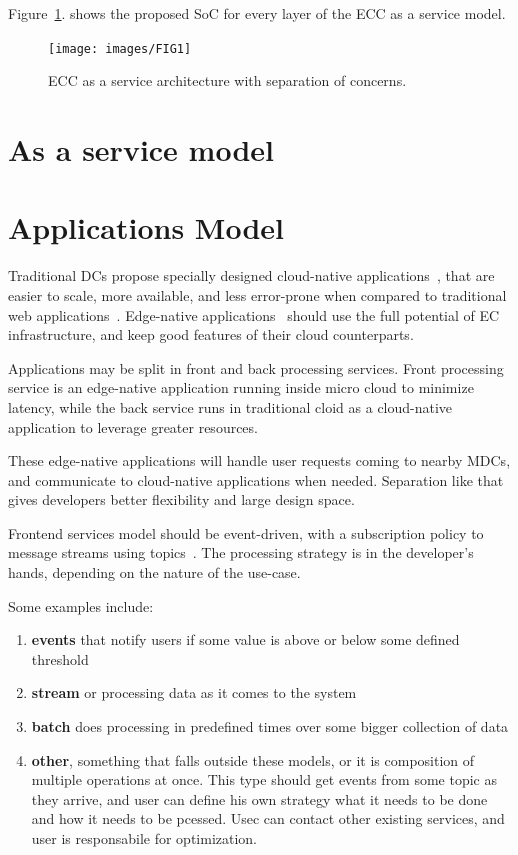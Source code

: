 Figure~\ref{fig:fig10}. shows the proposed SoC for every layer of the ECC as a service model.

\begin{figure}[H]
	\texttt{[image: images/FIG1]}
	\vspace{-0.7cm}
	\caption{ECC as a service architecture with separation of concerns.}
	\label{fig:fig10}
\end{figure}
%
%
\section{As a service model}\label{sec:as_a_service_model}
%
%
\section{Applications Model}\label{sec:application_model}
%
Traditional DCs propose specially designed cloud-native applications~\cite{GannonBS17}, that are easier to scale, more available, and less error-prone when compared to traditional web applications~\cite{GannonBS17}. Edge-native applications~\cite{SatyanarayananK19} should use the full potential of EC infrastructure, and keep good features of their cloud counterparts. 

Applications may be split in front and back processing services. Front processing service is an edge-native application running inside micro cloud to minimize latency, while the back service runs in traditional cloid as a cloud-native application to leverage greater resources. 

These edge-native applications will handle user requests coming to nearby MDCs, and communicate to cloud-native applications when needed. Separation like that gives developers better flexibility and large design space. 

Frontend services model should be event-driven, with a subscription policy to message streams using topics~\cite{inproceedingsBeck}. The processing strategy is in the developer's hands, depending on the nature of the use-case. 

Some examples include:

\begin{enumerate}[start=1,label={(\bfseries \arabic*)}]
	\item \textbf{events} that notify users if some value is above or below some defined threshold 
	\item \textbf{stream} or processing data as it comes to the system 
	\item \textbf{batch} does processing in predefined times over some bigger collection of data 
	\item \textbf{other}, something that falls outside these models, or it is composition of multiple operations at once. This type should get events from some topic as they arrive, and user can define his own strategy what it needs to be done and how it needs to be pcessed. Usec can contact other existing services, and user is responsabile for optimization.
\end{enumerate}

